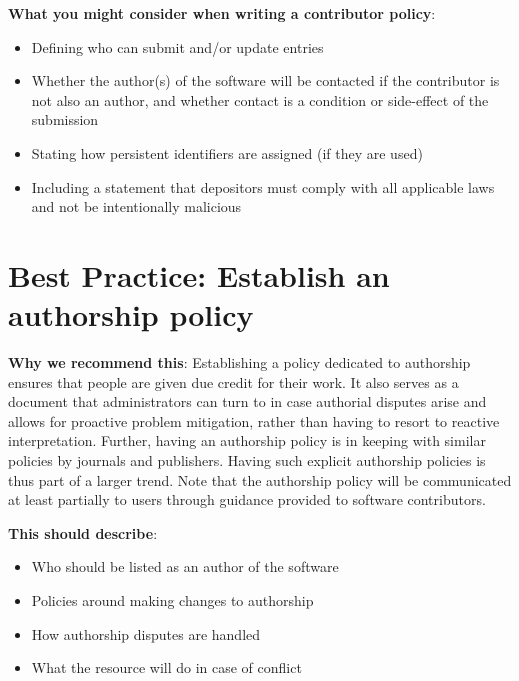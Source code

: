 \documentclass[11pt]{article}
\begin{document}
\textbf{What you might consider when writing a contributor policy}:

\begin{itemize}
\item Defining who can submit and/or update entries

\item Whether the author(s) of the software will be contacted if the contributor is not also an author, and whether contact is a condition or side-effect of the submission

\item Stating how persistent identifiers are assigned (if they are used)

\item Including a statement that depositors must comply with all applicable laws and not be intentionally malicious

\end{itemize}


\section{Best Practice: Establish an authorship policy}
\label{best-practice-establish-an-authorship-policy}

\textbf{Why we recommend this}: Establishing a policy dedicated to authorship ensures that people are given due credit for their work. It also serves as a document that administrators can turn to in case authorial disputes arise and allows for proactive problem mitigation, rather than having to resort to reactive interpretation. Further, having an authorship policy is in keeping with similar policies by journals and publishers. Having such explicit authorship policies is thus part of a larger trend. Note that the authorship policy will be communicated at least partially to users through guidance provided to software contributors.

\textbf{This should describe}:

\begin{itemize}
\item Who should be listed as an author of the software

\item Policies around making changes to authorship

\item How authorship disputes are handled

\item What the resource will do in case of conflict

\end{itemize}
\end{document}
